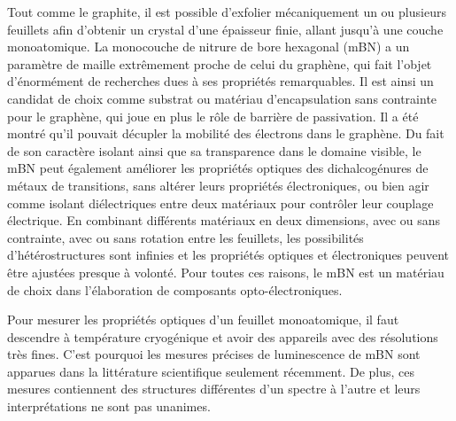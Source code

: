 Tout comme le graphite, il est possible d'exfolier mécaniquement un ou plusieurs feuillets afin d'obtenir un crystal d'une épaisseur finie, allant jusqu'à une couche monoatomique. La monocouche de nitrure de bore hexagonal (mBN) a un paramètre de maille extrêmement proche de celui du graphène, qui fait l'objet d'énormément de recherches dues à ses propriétés remarquables. Il est ainsi un candidat de choix comme substrat ou matériau d'encapsulation sans contrainte pour le graphène, qui joue en plus le rôle de barrière de passivation. Il a été montré qu'il pouvait décupler la mobilité des électrons dans le graphène.
Du fait de son caractère isolant ainsi que sa transparence dans le domaine visible, le mBN peut également améliorer les propriétés optiques des dichalcogénures de métaux de transitions,
sans altérer leurs propriétés électroniques, ou bien agir comme isolant diélectriques entre deux matériaux pour contrôler leur couplage électrique.
En combinant différents matériaux en deux dimensions, avec ou sans contrainte, avec ou sans rotation entre les feuillets, les possibilités d'hétérostructures sont infinies et les propriétés optiques et électroniques peuvent être ajustées presque à volonté. Pour toutes ces raisons, le mBN est un matériau de choix dans l'élaboration de composants opto-électroniques. 

Pour mesurer les propriétés optiques d'un feuillet monoatomique, il faut descendre à température cryogénique et avoir des appareils avec des résolutions très fines. C'est pourquoi les mesures précises de luminescence de mBN sont apparues dans la littérature scientifique seulement récemment. De plus, ces mesures contiennent des structures différentes d'un spectre à l'autre et leurs interprétations ne sont pas unanimes. \\

